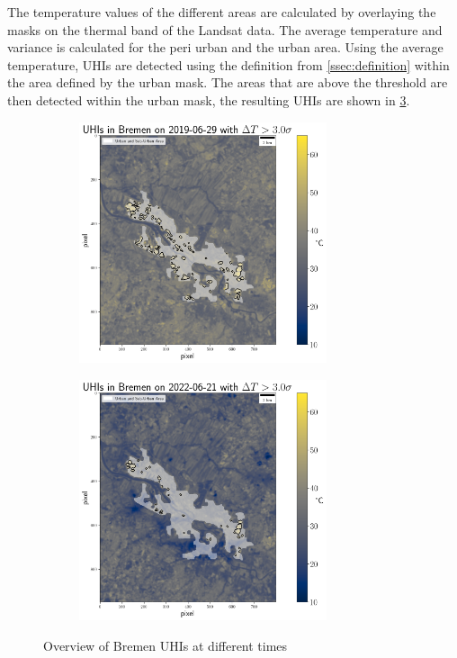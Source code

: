 \documentclass[12pt,a4paper, english,twoside]{scrartcl}
\begin{document}
      \noindent
      The temperature values of the different areas are calculated by overlaying the masks on the thermal band of the Landsat data. 
      The average temperature and variance is calculated for the peri urban and the urban area.
      Using the average temperature, \glspl{UHI} are detected using the definition from \cref{ssec:definition} within the area defined by the urban mask. 
      The areas that are above the threshold are then detected within the urban mask, the resulting \glspl{UHI} are shown in \cref{fig:AnalysisBre}. 
   \begin{figure}[!p]
       \begin{subfigure}{\textwidth}
          \centering
          \includegraphics[width=0.8\textwidth]{img/UHIs_Bremen_2019-06-29_s:3}
         \label{fig:uhis2019}
       \end{subfigure}

       \begin{subfigure}{\textwidth}
          \centering
          \includegraphics[width=0.8\textwidth]{img/UHIs_Bremen_2022-06-21_s:3}
         \label{fig:uhis2022}
       \end{subfigure}
         \caption{Overview of Bremen \glspl{UHI} at different times}\label{fig:AnalysisBre}
   \end{figure}
\end{document}

